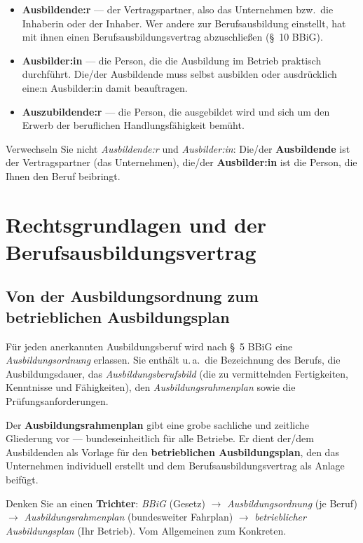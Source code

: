 \documentclass[11pt, a4paper]{article}
\begin{document}
\begin{itemize}
  \item \textbf{Ausbildende:r} --- der Vertragspartner, also das Unternehmen bzw.\ die
    Inhaberin oder der Inhaber. Wer andere zur Berufsausbildung einstellt, hat mit ihnen
    einen Berufsausbildungsvertrag abzuschließen (\S~10 BBiG).
  \item \textbf{Ausbilder:in} --- die Person, die die Ausbildung im Betrieb praktisch
    durchführt. Die/der Ausbildende muss selbst ausbilden oder ausdrücklich eine:n
    Ausbilder:in damit beauftragen.
  \item \textbf{Auszubildende:r} --- die Person, die ausgebildet wird und sich um den Erwerb
    der beruflichen Handlungsfähigkeit bemüht.
\end{itemize}

\begin{merksatz}
Verwechseln Sie nicht \emph{Ausbildende:r} und \emph{Ausbilder:in}: Die/der \textbf{Ausbildende}
ist der Vertragspartner (das Unternehmen), die/der \textbf{Ausbilder:in} ist die Person, die
Ihnen den Beruf beibringt.
\end{merksatz}

\section{Rechtsgrundlagen und der Berufsausbildungsvertrag}

\subsection{Von der Ausbildungsordnung zum betrieblichen Ausbildungsplan}

Für jeden anerkannten Ausbildungsberuf wird nach \S~5 BBiG eine \emph{Ausbildungsordnung}
erlassen. Sie enthält u.\,a.\ die Bezeichnung des Berufs, die Ausbildungsdauer, das
\emph{Ausbildungsberufsbild} (die zu vermittelnden Fertigkeiten, Kenntnisse und Fähigkeiten),
den \emph{Ausbildungsrahmenplan} sowie die Prüfungsanforderungen.

Der \textbf{Ausbildungsrahmenplan} gibt eine grobe sachliche und zeitliche Gliederung vor ---
bundeseinheitlich für alle Betriebe. Er dient der/dem Ausbildenden als Vorlage für den
\textbf{betrieblichen Ausbildungsplan}, den das Unternehmen individuell erstellt und dem
Berufsausbildungsvertrag als Anlage beifügt.

\begin{eselsbruecke}
Denken Sie an einen \textbf{Trichter}: \emph{BBiG} (Gesetz) $\rightarrow$
\emph{Ausbildungsordnung} (je Beruf) $\rightarrow$ \emph{Ausbildungsrahmenplan}
(bundesweiter Fahrplan) $\rightarrow$ \emph{betrieblicher Ausbildungsplan} (Ihr Betrieb).
Vom Allgemeinen zum Konkreten.
\end{eselsbruecke}
\end{document}

